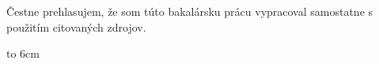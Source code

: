 \documentclass[11pt]{book}
\begin{document}
{~}\vspace{12cm}

\begin{minipage}{0.25\textwidth}~\end{minipage}
\begin{minipage}{0.69\textwidth}
Čestne prehlasujem, že som túto bakalársku prácu vypracoval samostatne
s použitím citovaných zdrojov.

\bigskip\bigskip

\hfill\hbox to 6cm{\dotfill}
\end{minipage}
\vfill\eject %

~\vfill\eject %

\tableofcontents


\mainmatter



\backmatter
\listoffigures
\listoftables



\end{document}
